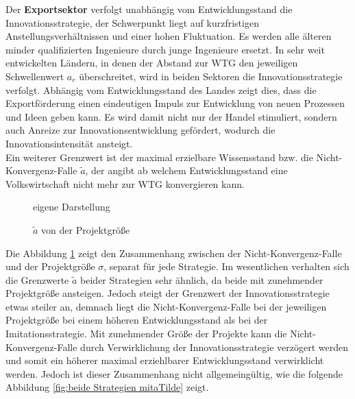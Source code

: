 Der \textbf{Exportsektor} verfolgt unabhängig vom Entwicklungsstand die \textcolor[rgb]{0.74,0.97,0.22}{Innovationsstrategie}, der Schwerpunkt liegt auf kurzfristigen Anstellungsverhältnissen und einer hohen Fluktuation. Es werden alle älteren minder qualifizierten Ingenieure durch junge Ingenieure ersetzt.
In sehr weit entwickelten Ländern, in denen der Abstand zur WTG den jeweiligen Schwellenwert $a_r$ überschreitet, wird in beiden Sektoren die \textcolor[rgb]{0.74,0.97,0.22}{Innovationsstrategie} verfolgt. Abhängig vom Entwicklungsstand des Landes zeigt dies, dass die Exportförderung einen eindeutigen Impuls zur Entwicklung von neuen Prozessen und Ideen geben kann. Es wird damit nicht nur der Handel stimuliert, sondern auch Anreize zur Innovationsentwicklung gefördert, wodurch die Innovationsintensität ansteigt. \\
Ein weiterer Grenzwert ist der maximal erzielbare Wissensstand bzw. die Nicht-Konvergenz-Falle $\tilde{a}$, der angibt ab welchem Entwicklungsstand eine Volkswirtschaft nicht mehr zur WTG konvergieren kann.\\


	\begin{figure}[htbp]
		\hfill{}  eigene Darstellung
		\caption{$\widetilde{a}$ von der Projektgröße} 
		\label{fig:aTilde}
	\end{figure}
%
Die Abbildung \ref{fig:aTilde} zeigt den Zusammenhang zwischen der Nicht-Konvergenz-Falle und der Projektgröße $\sigma$, separat für jede Strategie. Im wesentlichen verhalten sich die Grenzwerte $\tilde{a}$ beider Strategien sehr ähnlich, da beide mit zunehmender Projektgröße ansteigen. Jedoch steigt der Grenzwert der \textcolor[rgb]{0.74,0.97,0.22}{Innovationsstrategie} etwas steiler an, demnach liegt die Nicht-Konvergenz-Falle bei der jeweiligen Projektgröße bei einem höheren Entwicklungsstand als bei der \textcolor[rgb]{0,0.32,0}{Imitationsstrategie}. Mit zunehmender Größe der Projekte kann die Nicht-Konvergenz-Falle durch Verwirklichung der \textcolor[rgb]{0.74,0.97,0.22}{Innovationsstrategie} verzögert werden und somit ein höherer maximal erziehlbarer Entwicklungsstand verwirklicht werden. Jedoch ist dieser Zusammenhang nicht allgemeingültig, wie die folgende Abbildung \ref{fig:beide Strategien mitaTilde} zeigt. \\


